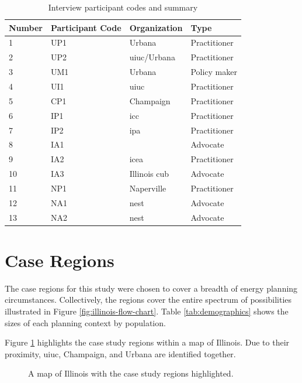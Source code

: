 \begin{table}[ht!]
    \centering
    \caption{Interview participant codes and summary}
    \label{tab:interviewees}
    \begin{tabular}{llll}
        \toprule
        Number & Participant Code & Organization & Type \\
        \midrule
        1& UP1 &Urbana& Practitioner\\ %
        2& UP2 &\ac{uiuc}/Urbana& Practitioner\\ %
        3& UM1 &Urbana & Policy maker\\ %
        4& UI1 & \ac{uiuc} & Practitioner\\ %
        5& CP1 & Champaign & Practitioner\\ %
        6& IP1 & \ac{icc} & Practitioner\\ %
        7& IP2 & \ac{ipa} & Practitioner\\ %
        8& IA1 && Advocate\\ %
        9& IA2 &\ac{icea}& Practitioner\\ %
        10& IA3 &Illinois \ac{cub} & Advocate\\ %
        11& NP1 & Naperville & Practitioner\\ %
        12& NA1 &\acs{nest}&Advocate\\ %
        13& NA2 &\acs{nest}&Advocate\\ %
        \bottomrule
    \end{tabular}
\end{table}


\section{Case Regions}
\label{section:cases}

The case regions for this study were chosen to cover a breadth of energy
planning circumstances. Collectively, the regions cover the entire spectrum of
possibilities illustrated in Figure \ref{fig:illinois-flow-chart}. Table
\ref{tab:demographics} shows the sizes of each planning context by population.

Figure \ref{fig:illinois-plot} highlights the case study regions within a map of
Illinois. Due to their proximity, \ac{uiuc}, Champaign, and Urbana are
identified together.

\begin{figure}[ht!]
    \centering
    \resizebox{0.4\columnwidth}{!}{}
    \caption{A map of Illinois with the case study regions highlighted.}
    \label{fig:illinois-plot}
\end{figure}

